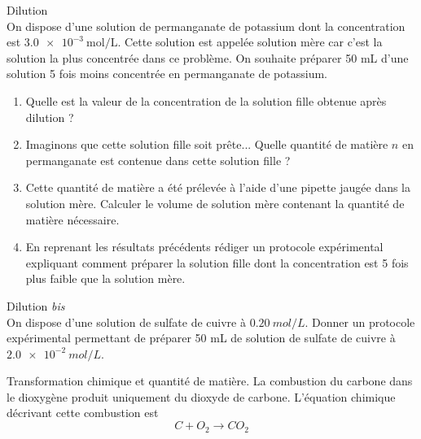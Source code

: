  \exo Dilution\\
 On dispose d'une solution de permanganate de potassium dont la concentration est $\SI{3,0e-3}{\mol\per\liter}$. Cette solution est appelée solution mère car c'est la solution la plus concentrée dans ce problème. On souhaite préparer 50 mL d'une solution 5 fois moins concentrée en permanganate de potassium.
 \begin{enumerate}
 \item Quelle est la valeur de la concentration de la solution fille obtenue après dilution ?
 \item Imaginons que cette solution fille soit prête... Quelle quantité de matière $n$ en permanganate est contenue dans cette solution fille ?
 \item Cette quantité de matière a été prélevée à l'aide d'une pipette jaugée dans la solution mère. Calculer le volume de solution mère contenant la quantité de matière nécessaire.
 \item En reprenant les résultats précédents rédiger un protocole expérimental expliquant comment préparer la solution fille dont la concentration est 5 fois plus faible que la solution mère.
 \end{enumerate}
 
 \exo
Dilution \emph{bis}
\\
On dispose d'une solution de sulfate de cuivre à $\SI{0.20}{mol/L}$. Donner un protocole expérimental permettant de préparer 50 mL de solution de sulfate de cuivre à $\SI{2.0e-2}{mol/L}$.

\exo Transformation chimique et quantité de matière.
La combustion du carbone dans le dioxygène produit uniquement du dioxyde de carbone. L'équation chimique décrivant cette combustion est $$C+O_2\longrightarrow CO_2$$

